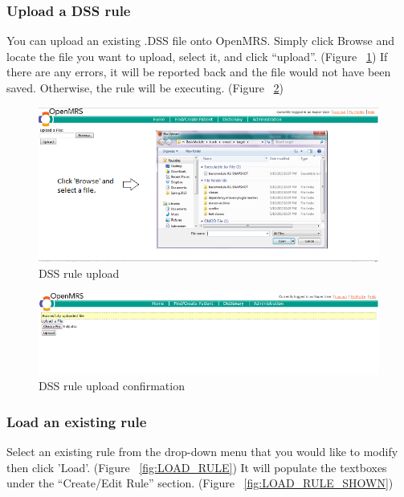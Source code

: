 \documentclass[12pt,letterpaper]{article}
\begin{document}
\subsubsection{Upload a DSS rule}
	You can upload an existing .DSS file onto OpenMRS. Simply click Browse and locate the file you want to upload, select it, and click “upload”.
	(Figure ~\ref{fig:UPLOAD_BROWSE}) If there are any errors, it will be reported back and the file would not have been saved. Otherwise, the rule will be executing. (Figure ~\ref{fig:UPLOAD_SUCCESS})

\begin{figure}\begin{center}
\includegraphics[width=6.5in]{user_guide/upload_browse.png}
\end{center}
\caption{DSS rule upload}
\label{fig:UPLOAD_BROWSE}
\end{figure}

\begin{figure}\begin{center}
\includegraphics[width=6.5in]{user_guide/upload_success.png}
\end{center}
\caption{DSS rule upload confirmation}
\label{fig:UPLOAD_SUCCESS}
\end{figure}


\subsubsection{Load an existing rule}

Select an existing rule from the drop-down menu that you would like to modify then click 'Load'. (Figure ~\ref{fig:LOAD_RULE})
It will populate the textboxes under the “Create/Edit Rule” section. 
(Figure ~\ref{fig:LOAD_RULE_SHOWN})
\end{document}

